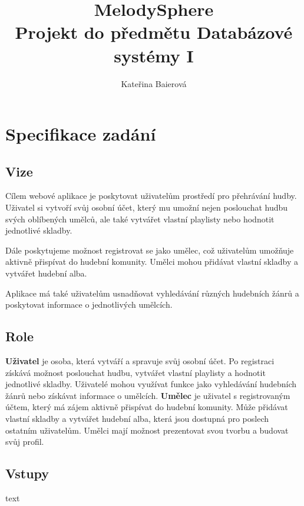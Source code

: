 \documentclass[czech,12pt,a4paper,titlepage]{article}
\title{%
    \textbf {MelodySphere} \\
    \bigskip
    \large Projekt do předmětu Databázové systémy I}
\author{Kateřina Baierová}
\date{}
\begin{document}
    \graphicspath{ {./img/} }

    \begin{titlepage}
        \maketitle
        \thispagestyle{empty}
    \end{titlepage}

    \tableofcontents

    \clearpage


    \section{Specifikace zadání}\label{sec:specifikace-zadani}
    \subsection*{Vize}
    Cílem webové aplikace je poskytovat uživatelům prostředí pro přehrávání hudby.
    Uživatel si vytvoří svůj osobní účet, který mu umožní nejen poslouchat
    hudbu svých oblíbených umělců, ale také vytvářet
    vlastní playlisty nebo hodnotit jednotlivé skladby.

    Dále poskytujeme možnost registrovat se jako umělec,
    což uživatelům umožňuje aktivně přispívat do hudební komunity.
    Umělci mohou přidávat vlastní skladby a vytvářet hudební alba.

    Aplikace má také uživatelům usnadňovat vyhledávání různých hudebních žánrů
    a poskytovat informace o jednotlivých umělcích.


    \subsection*{Role}
    \textbf{Uživatel} je osoba, která vytváří a spravuje svůj osobní účet.
    Po registraci získává možnost poslouchat hudbu, vytvářet vlastní playlisty
    a hodnotit jednotlivé skladby.
    Uživatelé mohou využívat funkce jako vyhledávání hudebních žánrů nebo
    získávat informace o umělcích.
    \textbf{Umělec} je uživatel s registrovaným účtem, který má zájem aktivně přispívat do hudební komunity.
    Může přidávat vlastní skladby a vytvářet hudební alba, která jsou dostupná pro poslech ostatním uživatelům.
    Umělci mají možnost prezentovat svou tvorbu a budovat svůj profil.

    \subsection*{Vstupy}
    text
\end{document}
